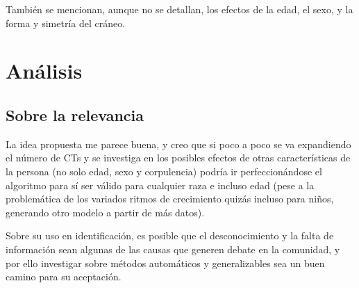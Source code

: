 \documentclass[13pt,a4paper]{article}
\begin{document}
También se mencionan, aunque no se detallan, los efectos de la edad, el sexo, y la forma y simetría del cráneo.


\section{Análisis}

\subsection{Sobre la relevancia}

La idea propuesta me parece buena, y creo que si poco a poco se va expandiendo el número de CTs y se investiga en los posibles efectos de otras características de la persona (no solo edad, sexo y corpulencia) podría ir perfeccionándose el algoritmo para sí ser válido para cualquier raza e incluso edad (pese a la problemática de los variados ritmos de crecimiento quizás incluso para niños, generando otro modelo a partir de más datos).






Sobre su uso en identificación, es posible que el desconocimiento y la falta de información sean algunas de las causas que generen debate en la comunidad, y por ello investigar sobre métodos automáticos y generalizables sea un buen camino para su aceptación.
\end{document}
